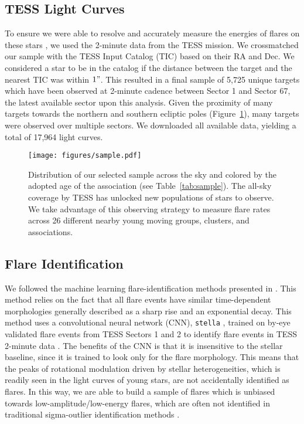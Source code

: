 \documentclass[twocolumn]{aastex631}
\begin{document}
\subsection{TESS Light Curves}

To ensure we were able to resolve and accurately measure the energies of flares
on these stars \citep{howard22}, we used the 2-minute data from the TESS mission.
We crossmatched our sample with the TESS Input Catalog (TIC) based on their RA and Dec.
We considered a star to be in the catalog if the distance between the target and
the nearest TIC was within $1"$. This resulted in a final sample of 5,725 unique targets
which have been observed at 2-minute cadence between Sector 1 and Sector 67, the
latest available sector upon this analysis. Given the proximity of many targets towards the
northern and southern ecliptic poles (Figure~\ref{fig:sample}), many targets were observed
over multiple sectors. We downloaded all available data, yielding a total of 17,964
light curves.

\begin{figure}[ht!]
    \begin{centering}
        \texttt{[image: figures/sample.pdf]}
        \caption{
            Distribution of our selected sample across the sky and colored by the
            adopted age of the association (see Table~\ref{tab:sample}). The all-sky
            coverage by TESS has unlocked new populations of stars to observe.
            We take advantage of this observing strategy to measure flare rates
            across 26 different nearby young moving groups, clusters, and associations.
        }
        \label{fig:sample}
    \end{centering}
\end{figure}


\subsection{Flare Identification}

We followed the machine learning flare-identification methods presented in
\cite{feinstein20a}. This method relies on the fact that all flare events
have similar time-dependent morphologies generally described as a sharp rise
and an exponential decay. This method uses a convolutional neural network (CNN),
\texttt{stella} \citep{feinstein20}, trained on by-eye validated flare events from
TESS Sectors 1 and 2 to identify flare events in TESS 2-minute data
\citep{guenther19_flares, feinstein20a}. The benefits of the CNN is that it is
insensitive to the stellar baseline, since it is trained to look only for the
flare morphology. This means that the peaks of rotational modulation driven by
stellar heterogeneities, which is readily seen in the light curves of young stars,
are not accidentally identified as flares. In this way, we are able to
build a sample of flares which is unbiased towards low-amplitude/low-energy flares,
which are often not identified in traditional sigma-outlier identification
methods \citep{chang15}.
\end{document}
